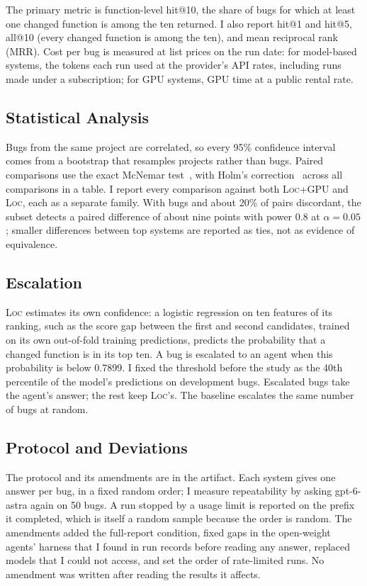 \documentclass[acmsmall,screen,review,anonymous]{acmart}
\newcommand{\tool}{\textsc{Loc}\xspace}
\newcommand{\tool}{Allfather\xspace}
\newcommand{\toolgpu}{\tool{}+GPU\xspace}
\begin{document}
The primary metric is function-level hit@10, the share of bugs for which at least one changed function is among the ten returned. I also report hit@1 and hit@5, all@10 (every changed function is among the ten), and mean reciprocal rank (MRR). Cost per bug is measured at list prices on the run date: for model-based systems, the tokens each run used at the provider's API rates, including runs made under a subscription; for GPU systems, GPU time at a public rental rate.

\subsection{Statistical Analysis}

Bugs from the same project are correlated, so every 95\% confidence interval comes from a bootstrap that resamples projects rather than bugs. Paired comparisons use the exact McNemar test~\cite{mcnemar1947}, with Holm's correction~\cite{holm1979} across all comparisons in a table. I report every comparison against both \toolgpu and \tool, each as a separate family. With \NAgent{} bugs and about 20\% of pairs discordant, the subset detects a paired difference of about nine points with power 0.8 at $\alpha=0.05$; smaller differences between top systems are reported as ties, not as evidence of equivalence.

\subsection{Escalation}

\tool estimates its own confidence: a logistic regression on ten features of its ranking, such as the score gap between the first and second candidates, trained on its own out-of-fold training predictions, predicts the probability that a changed function is in its top ten. A bug is escalated to an agent when this probability is below 0.7899. I fixed the threshold before the study as the 40th percentile of the model's predictions on development bugs. Escalated bugs take the agent's answer; the rest keep \tool's. The baseline escalates the same number of bugs at random.

\subsection{Protocol and Deviations}

The protocol and its amendments are in the artifact. Each system gives one answer per bug, in a fixed random order; I measure repeatability by asking gpt-6-astra again on 50 bugs. A run stopped by a usage limit is reported on the prefix it completed, which is itself a random sample because the order is random. The amendments added the full-report condition, fixed gaps in the open-weight agents' harness that I found in run records before reading any answer, replaced models that I could not access, and set the order of rate-limited runs. No amendment was written after reading the results it affects.
\end{document}
